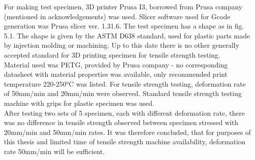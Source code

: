 \documentclass[a4paper, twoside, 11pt]{report}
\begin{document}
For making test specimen, 3D printer Prusa I3, borrowed from Prusa company (mentioned in acknowledgements) was used. Slicer software used for Gcode generation was Prusa slicer ver. 1.31.6. The test specimen has a shape as in fig. 5.1. The shape is given by the ASTM D638 standard, used for plastic parts made by injection molding or machining. Up to this date there is no other generally accepted standard for 3D printing specimen for tensile strength testing.\\
Material used was PETG, provided by Prusa company - no corresponding datasheet with material properties was available, only recommended print temperature 220-250°C was listed. For tensile strength testing, deformation rate of 50mm/min and 20mm/min were observed. Standard tensile strength testing machine with grips for plastic specimen was used.\\
After testing two sets of 5 specimen, each with different deformation rate, there was no difference in tensile strength observed between specimen stressed with 20mm/min and 50mm/min rates. It was therefore concluded, that for purposes of this thesis and limited time of tensile strength machine availability, deformation rate 50mm/min will be sufficient.
%
\newpage
\end{document}
